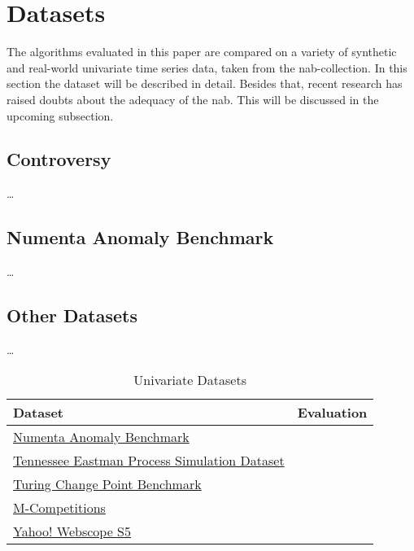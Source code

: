 \section{Datasets}\label{sect:datasets}
The algorithms evaluated in this paper are compared on a variety of synthetic
and real-world univariate time series data, taken from the \gls{nab}-collection.
In this section the dataset will be described in detail. Besides that, recent
research has raised doubts about the adequacy of the \gls{nab}. This will be
discussed in the upcoming subsection.

\subsection{Controversy}
\ldots

\subsection{Numenta Anomaly Benchmark}
\ldots

\subsection{Other Datasets}
\ldots


\begin{table}[h]\centering
        \begin{tabular}{ll}
            Dataset                                                                                                                             & Evaluation    \\\midrule
            \href{https://github.com/numenta/NAB}{Numenta Anomaly Benchmark}                                                                    &               \\\addlinespace
            \href{https://www.kaggle.com/averkij/tennessee-eastman-process-simulation-dataset}{Tennessee Eastman Process Simulation Dataset}    &               \\\addlinespace
            \href{https://github.com/alan-turing-institute/TCPDBench}{Turing Change Point Benchmark}                                            &               \\\addlinespace
            \href{https://en.wikipedia.org/wiki/Makridakis\_Competitions}{M-Competitions}                                                       &               \\\addlinespace
            \href{https://webscope.sandbox.yahoo.com/catalog.php?datatype=s\&did=70}{Yahoo! Webscope S5}                                        &               \\
        \end{tabular}
    \caption{Univariate Datasets}\label{tab:datasets}
\end{table}

